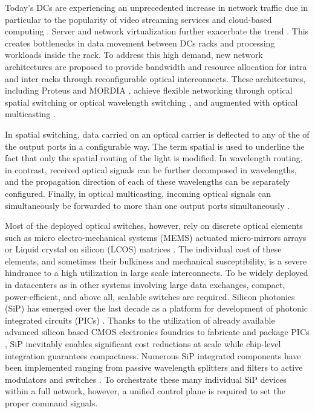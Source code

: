 Today's DCs are experiencing an unprecedented increase in network traffic due in particular to the popularity of video streaming services and cloud-based computing \cite{hashem2015rise}. Server and network virtualization further exacerbate the trend \cite{wang2010impact}. This creates bottlenecks in data movement between DCs racks and processing workloads inside the rack. To address this high demand, new network architectures are proposed to provide bandwidth and resource allocation \cite{wen2016flexfly} for intra \cite{yan_FPGA_DC} and inter  \cite{kachris2012survey,bergmanoptical} racks through reconfigurable optical interconnects. These architectures, including Proteus \cite{singla2010proteus} and MORDIA \cite{farrington201310,aguinaldo2014energy}, achieve flexible networking through optical spatial switching \cite{farrington2012demonstration} or optical wavelength switching \cite{zhang2012experimental}, and augmented with optical multicasting \cite{samadi2015optical,brunina2011building}.  

In spatial switching, data carried on an optical carrier is deflected to any of the of the output ports in a configurable way. The term spatial is used to underline the fact that only the spatial routing of the light is modified. In wavelength routing, in contrast, received optical signals can be further decomposed in wavelengths, and the propagation direction of each of these wavelengths can be separately configured. Finally, in optical multicasting, incoming optical signals can simultaneously be forwarded to more than one output ports simultaneously \cite{chen2011survey}.

Most of the deployed optical switches, however, rely on discrete optical elements such as micro electro-mechanical systems (MEMS) actuated micro-mirrors arrays or Liquid crystal on silicon (LCOS) matrices \cite{robertson2014demonstration,hamza2016free,wavelength2016}. The individual cost of these elements, and sometimes their bulkiness and mechanical susceptibility, is a severe hindrance to a high utilization in large scale interconnects. To be widely deployed in datacenters as in other systems involving large data exchanges, compact, power-efficient, and above all, scalable switches are required. Silicon photonics (SiP) has emerged over the last decade as a platform for development of photonic integrated circuits (PICs) \cite{komljenovic2016heterogeneous,alloatti2015photonics}. Thanks to the utilization of already available advanced silicon based CMOS electronics foundries to fabricate and package PICs \cite{novack201330,leemeeting,bogaerts2005nanophotonic}, SiP inevitably enables significant cost reductions at scale while chip-level integration guarantees compactness. Numerous SiP integrated components have been implemented ranging from passive wavelength splitters and filters to active modulators and switches \cite{lu201616,biberman2011broadband,subbaraman2015recent}. To orchestrate these many individual SiP devices within a full network, however, a unified control plane is required \cite{calhoun2016hardware,chen2015programmable} to set the proper command signals. 

